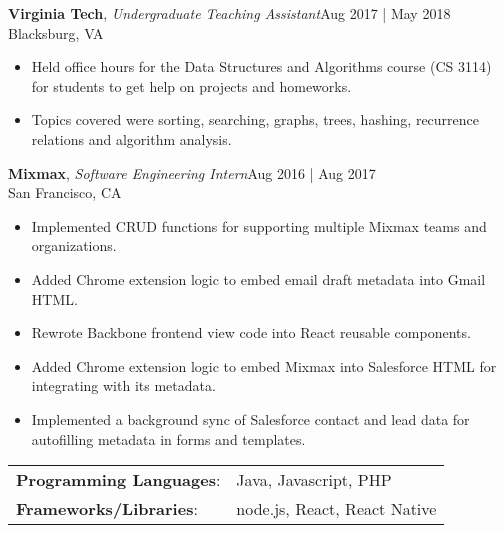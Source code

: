 \documentclass[line,margin]{res}
\begin{document}
\begin{resume}
		\textbf{Virginia Tech}, {\sl Undergraduate Teaching Assistant}\hfill Aug 2017 | May 2018\\Blacksburg, VA\\
		\begin{itemize} \itemsep 1pt
		\item Held office hours for the Data Structures and Algorithms course (CS 3114) for students
			  to get help on projects and homeworks.
		\item Topics covered were sorting, searching, graphs, trees, hashing, recurrence relations and algorithm analysis.
		\end{itemize}

		\textbf{Mixmax}, {\sl Software Engineering Intern}\hfill Aug 2016 | Aug 2017\\San Francisco, CA\\
		\begin{itemize} \itemsep 1pt
			\item Implemented CRUD functions for supporting multiple Mixmax teams and organizations.
			\item Added Chrome extension logic to embed email draft metadata into Gmail HTML.
			\item Rewrote Backbone frontend view code into React reusable components.
			\item Added Chrome extension logic to embed Mixmax into Salesforce HTML for integrating with its metadata.
			\item Implemented a background sync of Salesforce contact and lead data for autofilling metadata in forms and templates.
		\end{itemize}


	\begin{tabular}{@{}ll}
		\textbf{Programming Languages}: & Java, Javascript, PHP   \\
		\textbf{Frameworks/Libraries}:  & node.js, React, React Native \\
	\end{tabular}
\end{resume}
\end{document}
